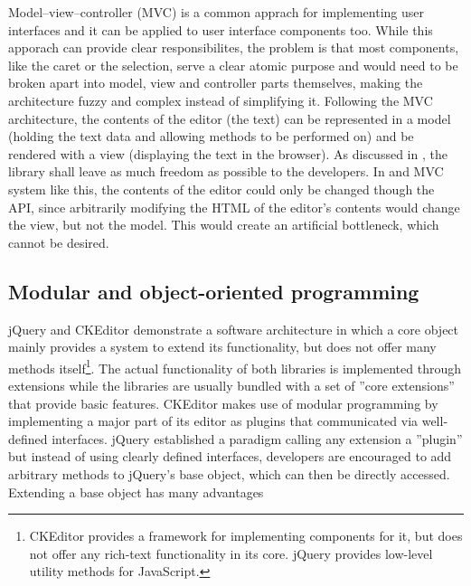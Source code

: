 Model--view--controller (MVC) is a common apprach for implementing user interfaces and it can be applied to user interface components too. While this apporach can provide clear responsibilites, the problem is that most components, like the caret or the selection, serve a clear atomic purpose and would need to be broken apart into model, view and controller parts themselves, making the architecture fuzzy and complex instead of simplifying it. Following the MVC architecture, the contents of the editor (the text) can be represented in a model (holding the text data and allowing methods to be performed on) and be rendered with a view (displaying the text in the browser). As discussed in , the library shall leave as much freedom as possible to the developers. In and MVC system like this, the contents of the editor could only be changed though the API, since arbitrarily modifying the HTML of the editor's contents would change the view, but not the model. This would create an artificial bottleneck, which cannot be desired.





\subsection{Modular and object-oriented programming}
\label{subsec:modular_and_oop}

jQuery and CKEditor demonstrate a software architecture in which a core object mainly provides a system to extend its functionality, but does not offer many methods itself\footnote{CKEditor provides a framework for implementing components for it, but does not offer any rich-text functionality in its core. jQuery provides low-level utility methods for JavaScript.}. The actual functionality of both libraries is implemented through extensions while the libraries are usually bundled with a set of ''core extensions'' that provide basic features. CKEditor makes use of modular programming by implementing a major part of its editor as plugins that communicated via well-defined interfaces. jQuery established a paradigm calling any extension a ''plugin'' but instead of using clearly defined interfaces, developers are encouraged to add arbitrary methods to jQuery's base object, which can then be directly accessed. Extending a base object has many advantages

